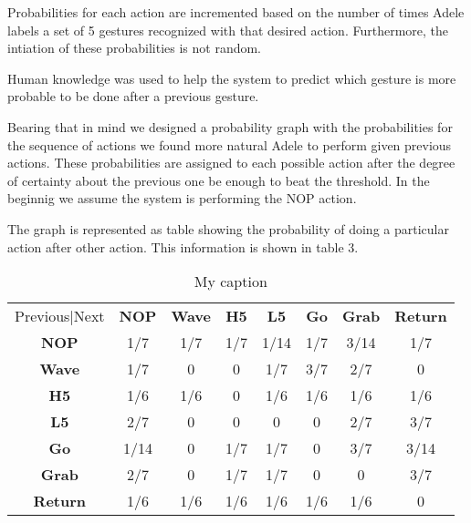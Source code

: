 Probabilities for each action are incremented based on the number of times Adele labels a set of 5 gestures recognized with that desired action. Furthermore, the intiation of these probabilities is not random. 

Human knowledge was used to help the system to predict which gesture is more probable to be done after a previous gesture. 

Bearing that in mind we designed a probability graph with the probabilities for the sequence of actions we found more natural Adele to perform given previous actions. These probabilities are assigned to each possible action after the degree of certainty about the previous one be enough to beat the threshold. In the beginnig we assume the system is performing the NOP action.

The graph is represented as table showing the probability of doing a particular action after other action. This information is shown in table 3.

\begin{table}[]
\centering
\begin{tabular}{cccccccc}
Previous|Next                        & \textbf{NOP} & \textbf{Wave} & \textbf{H5} & \textbf{L5} & \textbf{Go} & \textbf{Grab} & \textbf{Return} \\ \cline{2-8} 
\multicolumn{1}{c|}{\textbf{NOP}}    & 1/7          & 1/7           & 1/7         & 1/14        & 1/7         & 3/14          & 1/7             \\
\multicolumn{1}{c|}{\textbf{Wave}}   & 1/7          & 0             & 0           & 1/7         & 3/7         & 2/7           & 0               \\
\multicolumn{1}{c|}{\textbf{H5}}     & 1/6          & 1/6           & 0           & 1/6         & 1/6         & 1/6           & 1/6             \\
\multicolumn{1}{c|}{\textbf{L5}}     & 2/7          & 0             & 0           & 0           & 0           & 2/7           & 3/7             \\
\multicolumn{1}{c|}{\textbf{Go}}     & 1/14         & 0             & 1/7         & 1/7         & 0           & 3/7           & 3/14            \\
\multicolumn{1}{c|}{\textbf{Grab}}   & 2/7          & 0             & 1/7         & 1/7         & 0           & 0             & 3/7             \\
\multicolumn{1}{c|}{\textbf{Return}} & 1/6          & 1/6           & 1/6         & 1/6         & 1/6         & 1/6           & 0              
\end{tabular}
\caption{My caption}
\label{my-label}
\end{table}
